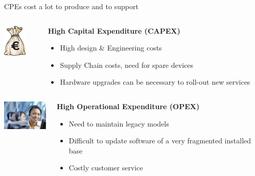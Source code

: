 \documentclass[a4paper]{beamer}
\begin{document}
\begin{frame}{CPEs cost a lot to produce and to support}
											
	\begin{columns}[T] 
		\begin{column}[T]{0.15 \textwidth} 
			\includegraphics[width=3em]{bagofmoney.jpg}
		\end{column}
																										
		\begin{column}[T]{0.75 \textwidth} %
																																							
																																								   
			\textbf{ High Capital Expenditure (CAPEX)}
			\begin{itemize}
				\item High design \& Engineering costs
				\item Supply Chain costs, need for spare devices
				\item Hardware upgrades can be necessary to roll-out new services
			\end{itemize}
			\vspace{3em}				     
																																							
		\end{column}
																										
	\end{columns}
											
											
	\begin{columns}[T] 
		\begin{column}[T]{0.15 \textwidth} 
			\includegraphics[width=6em]{customer-care.jpg}
		\end{column}
																						
																										
		\begin{column}[T]{0.75 \textwidth} %
																																							
																																								   
			\textbf{ High Operational Expenditure (OPEX)}
			\begin{itemize}
				\item Need to maintain legacy models
				\item Difficult to update software of a very fragmented installed base
				\item Costly customer service 
			\end{itemize}
																																								     

\end{column}
\end{columns}
\end{frame}
\end{document}
